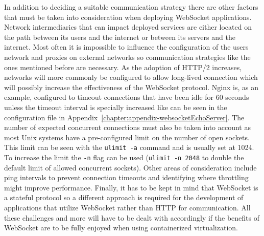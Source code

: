 In addition to deciding a suitable communication strategy there are other factors that must be taken into consideration when deploying WebSocket applications. Network intermediaries that can impact deployed services are either located on the path between its users and the internet or between its servers and the internet. Most often it is impossible to influence the configuration of the users network and proxies on external networks so communication strategies like the ones mentioned before are necessary. As the adoption of HTTP/2 increases, networks will more commonly be configured to allow long-lived connection which will possibly increase the effectiveness of the WebSocket protocol. Nginx is, as an example, configured to timeout connections that have been idle for 60 seconds unless the timeout interval is specially increased like can be seen in the configuration file in Appendix~\ref{chapter:appendix-websocketEchoServer}. The number of expected concurrent connections must also be taken into account as most Unix systems have a pre-configured limit on the number of open sockets. This limit can be seen with the \texttt{ulimit -a} command and is usually set at 1024. To increase the limit the \texttt{-n} flag can be used (\texttt{ulimit -n 2048} to double the default limit of allowed concurrent sockets). Other areas of consideration include ping intervals to prevent connection timeouts and identifying where throttling might improve performance. Finally, it has to be kept in mind that WebSocket is a stateful protocol so a different approach is required for the development of applications that utilize WebSocket rather than HTTP for communication. All these challenges and more will have to be dealt with accordingly if the benefits of WebSocket are to be fully enjoyed when using containerized virtualization.